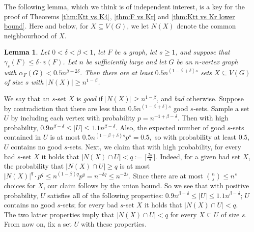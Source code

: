 \documentclass[11pt]{article}
\let\oldendproof\endproof
\renewenvironment{proof}[1][\proofname]{\oldproof[\bf #1]}{\oldendproof}
\theoremstyle{plain}
\newtheorem{lemma}[theorem]{Lemma}
\theoremstyle{definition}
\begin{document}
The following lemma, which we think is of independent interest, is a key for the proof of Theorems \ref{thm:Ktt vs K4}, \ref{thm:F vs Kr} and \ref{thm:Ktt vs Kr lower bound}. Here and below, for $X \subseteq V(G)$, we let $N(X)$ denote the common neighbourhood of $X$. 
\begin{lemma}\label{claim:sampling}
		Let $0<\delta<\beta<1$, let $F$ be a graph, let $s \geq 1$, and
        suppose that $\gamma_s(F) \leq \delta \cdot v(F)$.
		Let $n$ be sufficiently large and let $G$ be an $n$-vertex graph with $\alpha_F(G) < 0.5n^{\beta-2\delta}$. Then there are at least $0.5 n^{(1-\beta+\delta)s}$ sets $X\subseteq V(G)$ of size $s$ with $|N(X)|\geq n^{1-\beta}$. 
\end{lemma}
\begin{proof}
    We say that an $s$-set $X$ is {\em good} if $|N(X)| \geq n^{1-\beta}$, and {\em bad} otherwise. Suppose by contradiction that there are less than $0.5 n^{(1-\beta+\delta)s}$ good $s$-sets. Sample a set $U$ by including each vertex with probability 
	$p = n^{-1+\beta-\delta}$. Then with high probability, $0.9n^{\beta-\delta} \leq |U| \leq 1.1n^{\beta-\delta}$. Also, the expected number of good $s$-sets contained in $U$ is at most
		$
		0.5n^{(1-\beta+\delta)s} p^s = 0.5,
		$ 
		so with probability at least $0.5$, $U$ contains no good $s$-sets.
		Next, we claim that with high probability, for every bad $s$-set $X$ it holds that $|N(X) \cap U| < q := \lceil \frac{2s}{\delta} \rceil$. Indeed, for a given bad set $X$, the probability that $|N(X) \cap U| \geq q$ is at most 
        $|N(X)|^q \cdot p^q \leq n^{(1-\beta)q}p^q = n^{-\delta q} \leq n^{-2s}$. Since there are at most $\binom{n}{s} \leq n^s$ choices for $X$, our claim follows by the union bound. So we see that with positive probability, $U$ satisfies all of the following properties: $0.9n^{\beta-\delta} \leq |U| \leq 1.1n^{\beta-\delta}$; $U$ contains no good $s$-sets; for every bad $s$-set $X$ it holds that $|N(X) \cap U| < q$. The two latter properties imply that $|N(X) \cap U| < q$ for every $X \subseteq U$ of size $s$. From now on, fix a set $U$ with these properties. 


\end{proof}
\end{document}
